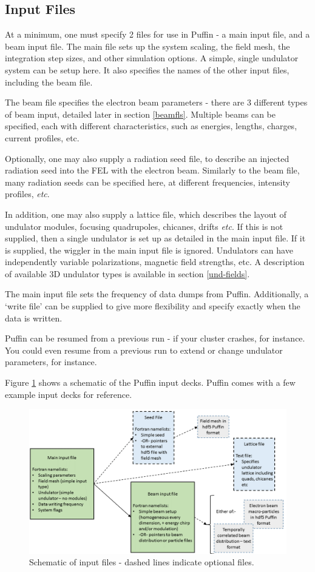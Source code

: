 \subsection{Input Files}

At a minimum, one must specify 2 files for use in Puffin - a main input file, and a beam input file. The main file sets up the system scaling, the field mesh, the integration step sizes, and other simulation options. A simple, single undulator system can be setup here. It also specifies the names of the other input files, including the beam file.

The beam file specifies the electron beam parameters - there are 3 different types of beam input, detailed later in section \ref{beamfls}. Multiple beams can be specified, each with different characteristics, such as energies, lengths, charges, current profiles, etc.

Optionally, one may also supply a radiation seed file, to describe an injected radiation seed into the FEL with the electron beam. Similarly to the beam file, many radiation seeds can be specified here, at different frequencies, intensity profiles, \textit{etc}.

In addition, one may also supply a lattice file, which describes the layout of undulator modules, focusing quadrupoles, chicanes, drifts \textit{etc}. If this is not supplied, then a single undulator is set up as detailed in the main input file. If it is supplied, the wiggler in the main input file is ignored. Undulators can have independently variable polarizations, magnetic field strengths, etc. A description of available 3D undulator types is available in section \ref{und-fields}.

The main input file sets the frequency of data dumps from Puffin. Additionally, a `write file' can be supplied to give more flexibility and specify exactly when the data is written.

Puffin can be resumed from a previous run - if your cluster crashes, for instance. You could even resume from a previous run to extend or change undulator parameters, for instance.

Figure \ref{inputs1} shows a schematic of the Puffin input decks. Puffin comes with a few example input decks for reference.

\begin{figure}
\centering
\includegraphics[width=120mm]{InputFiles.png}
\caption{Schematic of input files - dashed lines indicate optional files.}
\label{inputs1}
\end{figure}